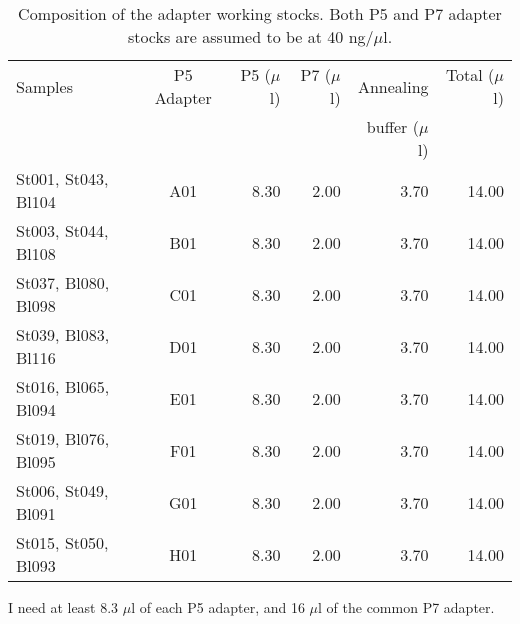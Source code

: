 \documentclass[a4paper,12pt,twosided]{article}
\begin{document}
\begin{table}
\begin{center}
\caption{Composition of the adapter working stocks. Both P5 and P7 adapter stocks are assumed to be at 40 ng/$\mu$l.}\label{tau:stocks}
\vspace*{0.2cm}
\begin{tabular}{lcrrrr}
\toprule
Samples&P5 Adapter&P5 ($\mu$l)&P7 ($\mu$l)&Annealing&Total ($\mu$l)\\
&&&&buffer ($\mu$l)&\\
\midrule
St001, St043, Bl104&A01&8.30&2.00&3.70&14.00\\
St003, St044, Bl108&B01&8.30&2.00&3.70&14.00\\
St037, Bl080, Bl098&C01&8.30&2.00&3.70&14.00\\
St039, Bl083, Bl116&D01&8.30&2.00&3.70&14.00\\
St016, Bl065, Bl094&E01&8.30&2.00&3.70&14.00\\
St019, Bl076, Bl095&F01&8.30&2.00&3.70&14.00\\
St006, St049, Bl091&G01&8.30&2.00&3.70&14.00\\
St015, St050, Bl093&H01&8.30&2.00&3.70&14.00\\
\bottomrule
\end{tabular}
\end{center}
\end{table}

I need at least 8.3 $\mu$l of each P5 adapter, and 16 $\mu$l of the common P7 adapter. 
\end{document}
